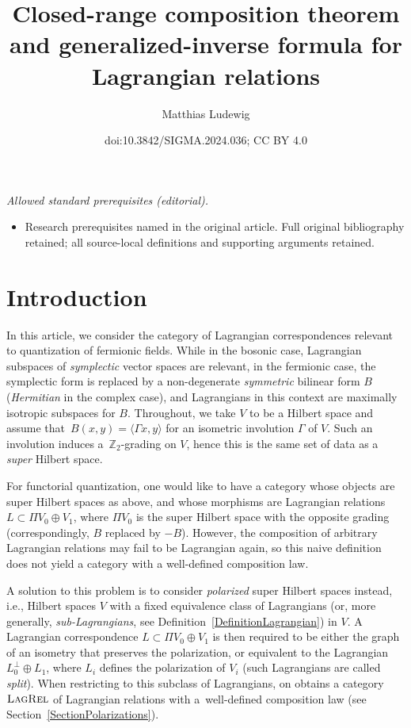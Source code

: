 \documentclass[10pt,a4paper]{amsart}
\title{Closed-range composition theorem and generalized-inverse formula for Lagrangian relations}
\author{Matthias Ludewig}
\date{doi:10.3842/SIGMA.2024.036; CC BY 4.0}
\numberwithin{equation}{section}
\newcommand{\LagRel}{\textsc{LagRel}}
\newcommand{\Z}{\mathbb{Z}}
\begin{document}
\maketitle
\noindent\textit{Allowed standard prerequisites (editorial).}\begin{itemize}
\item Research prerequisites named in the original article. Full original bibliography retained; all source-local definitions and supporting arguments retained.
\end{itemize}\medskip
\section{Introduction}

In this article, we consider the category of Lagrangian correspondences relevant to quantization of fermionic fields.
While in the bosonic case, Lagrangian subspaces of \emph{symplectic} vector spaces are relevant, in the fermionic case, the symplectic form is replaced by a non-degenerate \emph{symmetric} bilinear form $B$ (\emph{Hermitian} in the complex case), and Lagrangians in this context are maximally isotropic subspaces for $B$.
Throughout, we take $V$ to be a Hilbert space and assume that~${B(x, y) = \langle \Gamma x, y\rangle}$ for an isometric involution $\Gamma$ of $V$.
Such an involution induces a~$\Z_2$-grading on $V$, hence this is the same set of data as a \emph{super} Hilbert space.

For functorial quantization, one would like to have a category whose objects are super Hilbert spaces as above, and whose morphisms are Lagrangian relations $L \subset \Pi V_0 \oplus V_1$, where $\Pi V_0$ is the super Hilbert space with the opposite grading (correspondingly, $B$ replaced by $-B$).
However, the composition of arbitrary Lagrangian relations may fail to be Lagrangian again, so this naive definition does not yield a category with a well-defined composition law.

A solution to this problem is to consider \emph{polarized} super Hilbert spaces instead, i.e., Hilbert spaces $V$ with a fixed equivalence class of Lagrangians (or, more generally, \emph{sub-Lagrangians}, see Definition~\ref{DefinitionLagrangian}) in $V$.
A Lagrangian correspondence $L \subset \Pi V_0 \oplus V_1$ is then required to be either the graph of an isometry that preserves the polarization, or equivalent to the Lagrangian $L_0^\perp \oplus L_1$, where $L_i$ defines the polarization of $V_i$ (such Lagrangians are called \emph{split}).
When restricting to this subclass of Lagrangians, on obtains a category $\LagRel$ of Lagrangian relations with a~well-defined composition law (see Section~\ref{SectionPolarizations}).
\end{document}
